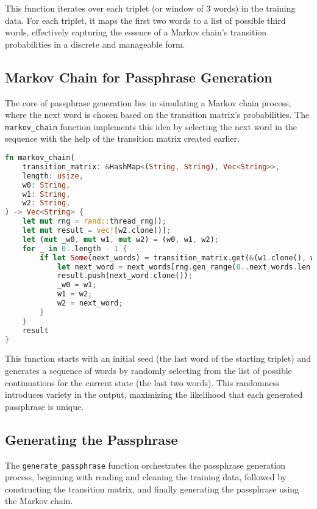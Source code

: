 \documentclass[a4paper,12pt]{article}
\begin{document}
This function iterates over each triplet (or window of 3 words) in the training data. For each triplet, it maps the first two words to a list of possible third words, effectively capturing the essence of a Markov chain's transition probabilities in a discrete and manageable form.

\subsection{Markov Chain for Passphrase Generation}
The core of passphrase generation lies in simulating a Markov chain process, where the next word is chosen based on the transition matrix's probabilities. The \texttt{markov\_chain} function implements this idea by selecting the next word in the sequence with the help of the transition matrix created earlier.

\begin{lstlisting}[language=Rust, caption={Markov Chain Function}]
fn markov_chain(
    transition_matrix: &HashMap<(String, String), Vec<String>>,
    length: usize,
    w0: String,
    w1: String,
    w2: String,
) -> Vec<String> {
    let mut rng = rand::thread_rng();
    let mut result = vec![w2.clone()];
    let (mut _w0, mut w1, mut w2) = (w0, w1, w2);
    for _ in 0..length - 1 {
        if let Some(next_words) = transition_matrix.get(&(w1.clone(), w2.clone())) {
            let next_word = next_words[rng.gen_range(0..next_words.len())].clone();
            result.push(next_word.clone());
            _w0 = w1;
            w1 = w2;
            w2 = next_word;
        }
    }
    result
}
\end{lstlisting}

This function starts with an initial seed (the last word of the starting triplet) and generates a sequence of words by randomly selecting from the list of possible continuations for the current state (the last two words). This randomness introduces variety in the output, maximizing the likelihood that each generated passphrase is unique.

\subsection{Generating the Passphrase}
The \texttt{generate\_passphrase} function orchestrates the passphrase generation process, beginning with reading and cleaning the training data, followed by constructing the transition matrix, and finally generating the passphrase using the Markov chain.
\end{document}

